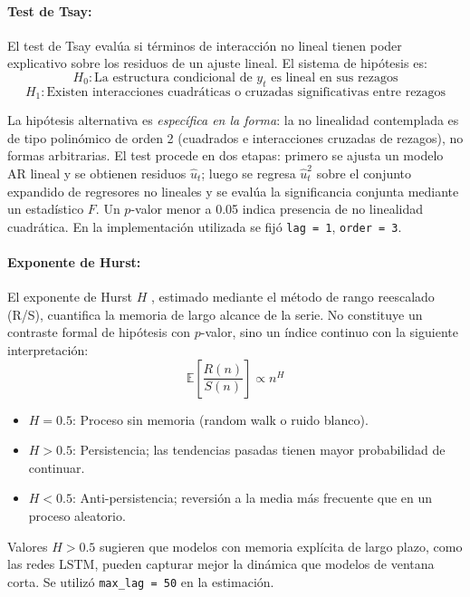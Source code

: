 \paragraph{Test de Tsay:}
El test de Tsay \parencite{Tsay1986} evalúa si términos de interacción no lineal tienen poder explicativo sobre los residuos de un ajuste lineal. El sistema de hipótesis es:
\begin{equation}
H_0: \text{La estructura condicional de } y_t \text{ es lineal en sus rezagos}
\end{equation}
\begin{equation}
H_1: \text{Existen interacciones cuadráticas o cruzadas significativas entre rezagos}
\end{equation}

La hipótesis alternativa es \textit{específica en la forma}: la no linealidad contemplada es de tipo polinómico de orden 2 (cuadrados e interacciones cruzadas de rezagos), no formas arbitrarias. El test procede en dos etapas: primero se ajusta un modelo AR lineal y se obtienen residuos $\hat{u}_t$; luego se regresa $\hat{u}_t^2$ sobre el conjunto expandido de regresores no lineales y se evalúa la significancia conjunta mediante un estadístico $F$. Un $p$-valor menor a 0.05 indica presencia de no linealidad cuadrática. En la implementación utilizada se fijó \texttt{lag = 1}, \texttt{order = 3}.

\paragraph{Exponente de Hurst:}
El exponente de Hurst $H$ \parencite{Hurst1951}, estimado mediante el método de rango reescalado (R/S), cuantifica la memoria de largo alcance de la serie. No constituye un contraste formal de hipótesis con $p$-valor, sino un índice continuo con la siguiente interpretación:
\begin{equation}
\mathbb{E}\left[\frac{R(n)}{S(n)}\right] \propto n^H
\end{equation}
\begin{itemize}
    \item $H = 0.5$: Proceso sin memoria (random walk o ruido blanco).
    \item $H > 0.5$: Persistencia; las tendencias pasadas tienen mayor probabilidad de continuar.
    \item $H < 0.5$: Anti-persistencia; reversión a la media más frecuente que en un proceso aleatorio.
\end{itemize}
Valores $H > 0.5$ sugieren que modelos con memoria explícita de largo plazo, como las redes LSTM, pueden capturar mejor la dinámica que modelos de ventana corta. Se utilizó \texttt{max\_lag = 50} en la estimación.

